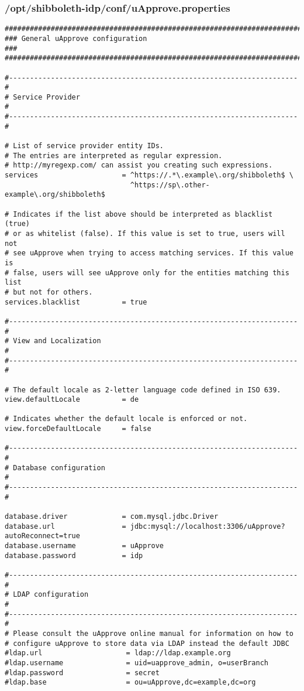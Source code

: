 \subsubsection{/opt/shibboleth-idp/conf/uApprove.properties}
\begin{lstlisting}
#######################################################################
### General uApprove configuration                                  ###
#######################################################################

#---------------------------------------------------------------------#
# Service Provider                                                    #
#---------------------------------------------------------------------#

# List of service provider entity IDs.
# The entries are interpreted as regular expression.
# http://myregexp.com/ can assist you creating such expressions.
services                    = ^https://.*\.example\.org/shibboleth$ \
                              ^https://sp\.other-example\.org/shibboleth$

# Indicates if the list above should be interpreted as blacklist (true)
# or as whitelist (false). If this value is set to true, users will not
# see uApprove when trying to access matching services. If this value is
# false, users will see uApprove only for the entities matching this list
# but not for others.
services.blacklist          = true

#---------------------------------------------------------------------#
# View and Localization                                               #
#---------------------------------------------------------------------#

# The default locale as 2-letter language code defined in ISO 639.
view.defaultLocale          = de

# Indicates whether the default locale is enforced or not.
view.forceDefaultLocale     = false

#---------------------------------------------------------------------#
# Database configuration                                              #
#---------------------------------------------------------------------#

database.driver             = com.mysql.jdbc.Driver
database.url                = jdbc:mysql://localhost:3306/uApprove?autoReconnect=true
database.username           = uApprove
database.password           = idp

#---------------------------------------------------------------------#
# LDAP configuration                                        	      #
#---------------------------------------------------------------------#
# Please consult the uApprove online manual for information on how to
# configure uApprove to store data via LDAP instead the default JDBC
#ldap.url                    = ldap://ldap.example.org
#ldap.username               = uid=uapprove_admin, o=userBranch
#ldap.password               = secret
#ldap.base                   = ou=uApprove,dc=example,dc=org


\end{lstlisting}
